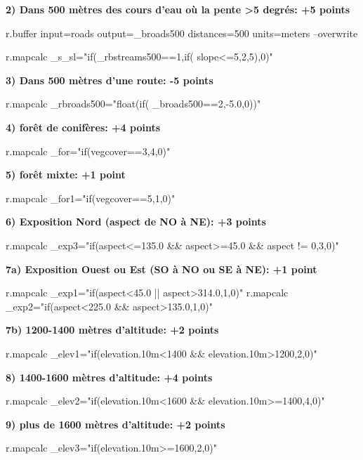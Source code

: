 \textbf{
2) Dans 500 m\`etres des cours d'eau o\`u la pente >5 degr\'es: +5 points}
\begin{smallverbatim}
r.buffer input=roads output=_broads500 distances=500
 units=meters --overwrite

r.mapcalc _s_sl="if(_rbstreams500==1,if(
 slope<=5,2,5),0)"
\end{smallverbatim}

\textbf{
3) Dans 500 m\`etres d'une route: -5 points}
\begin{smallverbatim}
r.mapcalc _rbroads500="float(if(
 _broads500==2,-5.0,0))"
\end{smallverbatim}

\textbf{
4) for\^et de conif\`eres: +4 points}
\begin{smallverbatim}
r.mapcalc _for="if(vegcover==3,4,0)"
\end{smallverbatim}

\textbf{
5) for\^et mixte: +1 point}
\begin{smallverbatim}
r.mapcalc _for1="if(vegcover==5,1,0)"
\end{smallverbatim}

\textbf{
6) Exposition Nord (aspect de NO \`a NE): +3 points}
\begin{smallverbatim}
r.mapcalc _exp3="if(aspect<=135.0 && aspect>=45.0
 && aspect != 0,3,0)"
\end{smallverbatim}

\textbf{
7a) Exposition Ouest ou Est (SO \`a NO ou SE \`a NE): +1 point}
\begin{smallverbatim}
r.mapcalc _exp1="if(aspect<45.0 || aspect>314.0,1,0)"
r.mapcalc _exp2="if(aspect<225.0 && aspect>135.0,1,0)"
\end{smallverbatim}

\textbf{
7b) 1200-1400 m\`etres d'altitude: +2 points}
\begin{smallverbatim}
r.mapcalc _elev1="if(elevation.10m<1400
 && elevation.10m>1200,2,0)"
\end{smallverbatim}

\textbf{
8) 1400-1600 m\`etres d'altitude: +4 points}
\begin{smallverbatim}
r.mapcalc _elev2="if(elevation.10m<1600
 && elevation.10m>=1400,4,0)"
\end{smallverbatim}

\textbf{
9) plus de 1600 m\`etres d'altitude: +2 points}
\begin{smallverbatim}
r.mapcalc _elev3="if(elevation.10m>=1600,2,0)"
\end{smallverbatim}

